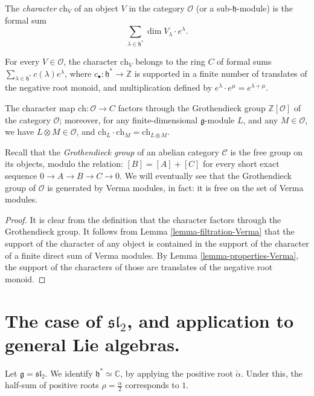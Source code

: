 \begin{definition}
 \label{definition-character}
The {\it character} $\text{ch}_V$ of an object $V$ in the category $\mathcal O$ (or a sub-$\mathfrak h$-module) is the formal sum 
$$\sum_{\lambda \in \mathfrak h^*} \dim V_\lambda \cdot e^\lambda.$$ 
\end{definition}

\begin{lemma}
 \label{lemma-character-inR}
For every $V\in \mathcal O$, the character $\text{ch}_V$ belongs to the ring $C$ of formal sums $\sum_{\lambda\in \mathfrak h^*} c(\lambda) e^\lambda$, where $c_\bullet: \mathfrak h^*\to \mathbb Z$ is supported in a finite number of translates of the negative root monoid, and multiplication defined by $e^\lambda \cdot e^\mu = e^{\lambda+\mu}$.

The character map $\text{ch}: \mathcal O \to C$ factors through the Grothendieck group $\mathbb Z[\mathcal O]$ of the category $\mathcal O$; moreover, for any finite-dimensional $\mathfrak g$-module $L$, and any $M\in\mathcal O$, we have $L\otimes M\in \mathcal O$, and $\text{ch}_L \cdot \text{ch}_M = \text{ch}_{L\otimes M}$. 
\end{lemma}

Recall that the \emph{Grothendieck group} of an abelian category $\mathcal C$ is the free group on its objects, modulo the relation: $[B]=[A]+[C]$ for every short exact sequence $0\to A \to B\to C\to 0$. We will eventually see that the Grothendieck group of $\mathcal O$ is generated by Verma modules, in fact: it is free on the set of Verma modules.

\begin{proof}
 It is clear from the definition that the character factors through the Grothendieck group. It follows from Lemma \ref{lemma-filtration-Verma} that the support of the character of any object is contained in the support of the character of a finite direct sum of Verma modules. By Lemma \ref{lemma-properties-Verma}, the support of the characters of those are translates of the negative root monoid.
\end{proof}


\section{The case of $\mathfrak{sl}_2$, and application to general Lie algebras.}
\label{section-sl2}

Let $\mathfrak g = \mathfrak{sl}_2$. We identify $\mathfrak h^* \simeq \mathbb C$, by applying the positive root $\check\alpha$. Under this, the half-sum of positive roots $\rho = \frac{\alpha}{2}$ corresponds to $1$.

